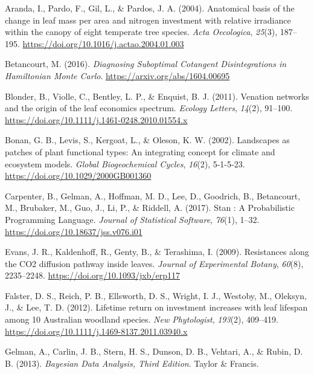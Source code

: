 \documentclass[
  12pt,
  a4paper,
,tablecaptionabove
]{scrartcl}
\newlength{\cslhangindent}
\newenvironment{CSLReferences}[2] %
 {%
  \setlength{\parindent}{0pt}
  \ifodd #1 \everypar{\setlength{\hangindent}{\cslhangindent}}\ignorespaces\fi
  \ifnum #2 > 0
  \setlength{\parskip}{#2\baselineskip}
  \fi
 }%
 {}
\begin{document}
\hypertarget{refs}{}
\begin{CSLReferences}{1}{0}
\leavevmode{}%
Aranda, I., Pardo, F., Gil, L., \& Pardos, J. A. (2004). Anatomical
basis of the change in leaf mass per area and nitrogen investment with
relative irradiance within the canopy of eight temperate tree species.
\emph{Acta Oecologica}, \emph{25}(3), 187--195.
\url{https://doi.org/10.1016/j.actao.2004.01.003}

\leavevmode{}%
Betancourt, M. (2016). \emph{Diagnosing {Suboptimal Cotangent
Disintegrations} in {Hamiltonian Monte Carlo}}.
\url{https://arxiv.org/abs/1604.00695}

\leavevmode{}%
Blonder, B., Violle, C., Bentley, L. P., \& Enquist, B. J. (2011).
Venation networks and the origin of the leaf economics spectrum.
\emph{Ecology Letters}, \emph{14}(2), 91--100.
\url{https://doi.org/10.1111/j.1461-0248.2010.01554.x}

\leavevmode{}%
Bonan, G. B., Levis, S., Kergoat, L., \& Oleson, K. W. (2002).
Landscapes as patches of plant functional types: {An} integrating
concept for climate and ecosystem models. \emph{Global Biogeochemical
Cycles}, \emph{16}(2), 5-1-5-23.
\url{https://doi.org/10.1029/2000GB001360}

\leavevmode{}%
Carpenter, B., Gelman, A., Hoffman, M. D., Lee, D., Goodrich, B.,
Betancourt, M., Brubaker, M., Guo, J., Li, P., \& Riddell, A. (2017).
Stan : {A Probabilistic Programming Language}. \emph{Journal of
Statistical Software}, \emph{76}(1), 1--32.
\url{https://doi.org/10.18637/jss.v076.i01}

\leavevmode{}%
Evans, J. R., Kaldenhoff, R., Genty, B., \& Terashima, I. (2009).
Resistances along the {CO2} diffusion pathway inside leaves.
\emph{Journal of Experimental Botany}, \emph{60}(8), 2235--2248.
\url{https://doi.org/10.1093/jxb/erp117}

\leavevmode{}%
Falster, D. S., Reich, P. B., Ellsworth, D. S., Wright, I. J., Westoby,
M., Oleksyn, J., \& Lee, T. D. (2012). Lifetime return on investment
increases with leaf lifespan among 10 {Australian} woodland species.
\emph{New Phytologist}, \emph{193}(2), 409--419.
\url{https://doi.org/10.1111/j.1469-8137.2011.03940.x}

\leavevmode{}%
Gelman, A., Carlin, J. B., Stern, H. S., Dunson, D. B., Vehtari, A., \&
Rubin, D. B. (2013). \emph{Bayesian {Data Analysis}, {Third Edition}}.
{Taylor \& Francis}.


\end{CSLReferences}
\end{document}

